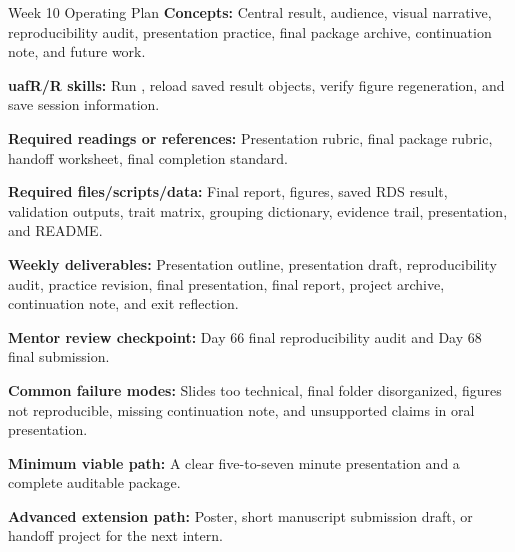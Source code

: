 \begin{checklistbox}{Week 10 Operating Plan}
\textbf{Concepts:} Central result, audience, visual narrative, reproducibility audit, presentation practice, final package archive, continuation note, and future work.

\textbf{uafR/R skills:} Run , reload saved result objects, verify figure regeneration, and save session information.

\textbf{Required readings or references:} Presentation rubric, final package rubric, handoff worksheet, final completion standard.

\textbf{Required files/scripts/data:} Final report, figures, saved RDS result, validation outputs, trait matrix, grouping dictionary, evidence trail, presentation, and README.

\textbf{Weekly deliverables:} Presentation outline, presentation draft, reproducibility audit, practice revision, final presentation, final report, project archive, continuation note, and exit reflection.

\textbf{Mentor review checkpoint:} Day 66 final reproducibility audit and Day 68 final submission.

\textbf{Common failure modes:} Slides too technical, final folder disorganized, figures not reproducible, missing continuation note, and unsupported claims in oral presentation.

\textbf{Minimum viable path:} A clear five-to-seven minute presentation and a complete auditable package.

\textbf{Advanced extension path:} Poster, short manuscript submission draft, or handoff project for the next intern.
\end{checklistbox}

